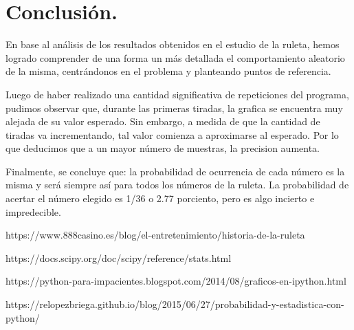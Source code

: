\documentclass{article}
\begin{document}
\section{Conclusión.}
En base al análisis de los resultados obtenidos en el estudio de la ruleta, hemos logrado comprender de una forma un más detallada el comportamiento aleatorio de la misma, centrándonos en el problema y planteando puntos de referencia. 

Luego de haber realizado una cantidad significativa de repeticiones del programa, pudimos observar que, durante las primeras tiradas, la grafica se encuentra muy alejada de su valor esperado. Sin embargo, a medida de que la cantidad de tiradas va incrementando, tal valor comienza a aproximarse al esperado. Por lo que deducimos que a un mayor número de muestras, la precision aumenta.

Finalmente, se concluye que: la probabilidad de ocurrencia de cada número es la misma y será siempre así para todos los números de la ruleta. La probabilidad de acertar el número elegido es 1/36 o 2.77 porciento, pero es algo incierto e impredecible.


\begin{thebibliography}{1}

https://www.888casino.es/blog/el-entretenimiento/historia-de-la-ruleta

https://docs.scipy.org/doc/scipy/reference/stats.html

https://python-para-impacientes.blogspot.com/2014/08/graficos-en-ipython.html

https://relopezbriega.github.io/blog/2015/06/27/probabilidad-y-estadistica-con-python/

\end{thebibliography}
\end{document}
